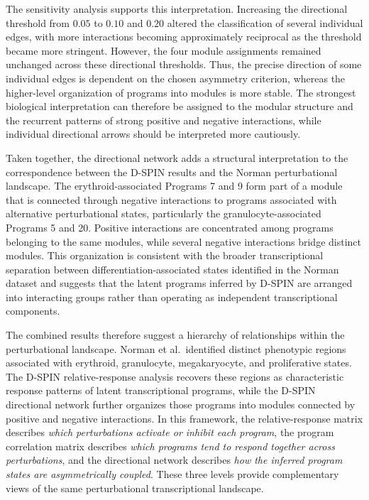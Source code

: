 \documentclass[11pt,a4paper]{article}
\begin{document}
The sensitivity analysis supports this interpretation. Increasing the directional threshold from $0.05$ to $0.10$ and $0.20$ altered the classification of several individual edges, with more interactions becoming approximately reciprocal as the threshold became more stringent. However, the four module assignments remained unchanged across these directional thresholds. Thus, the precise direction of some individual edges is dependent on the chosen asymmetry criterion, whereas the higher-level organization of programs into modules is more stable. The strongest biological interpretation can therefore be assigned to the modular structure and the recurrent patterns of strong positive and negative interactions, while individual directional arrows should be interpreted more cautiously.

Taken together, the directional network adds a structural interpretation to the correspondence between the D-SPIN results and the Norman perturbational landscape. The erythroid-associated Programs 7 and 9 form part of a module that is connected through negative interactions to programs associated with alternative perturbational states, particularly the granulocyte-associated Programs 5 and 20. Positive interactions are concentrated among programs belonging to the same modules, while several negative interactions bridge distinct modules. This organization is consistent with the broader transcriptional separation between differentiation-associated states identified in the Norman dataset and suggests that the latent programs inferred by D-SPIN are arranged into interacting groups rather than operating as independent transcriptional components.

The combined results therefore suggest a hierarchy of relationships within the perturbational landscape. Norman et al.~identified distinct phenotypic regions associated with erythroid, granulocyte, megakaryocyte, and proliferative states. The D-SPIN relative-response analysis recovers these regions as characteristic response patterns of latent transcriptional programs, while the D-SPIN directional network further organizes those programs into modules connected by positive and negative interactions. In this framework, the relative-response matrix describes \emph{which perturbations activate or inhibit each program}, the program correlation matrix describes \emph{which programs tend to respond together across perturbations}, and the directional network describes \emph{how the inferred program states are asymmetrically coupled}. These three levels provide complementary views of the same perturbational transcriptional landscape.
\end{document}
